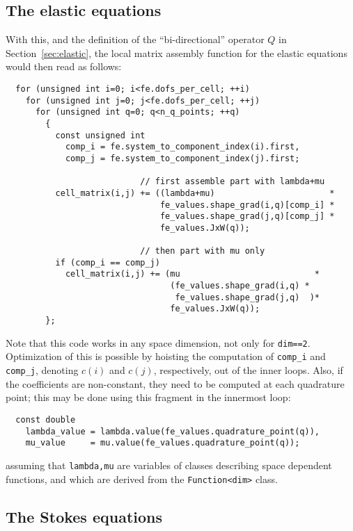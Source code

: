 \documentclass{article}
\begin{document}
\subsection{The elastic equations}
\label{sec:elastic-simple}

With this, and the definition of the ``bi-directional'' operator $Q$ in
Section~\ref{sec:elastic}, the local matrix assembly function for the elastic
equations would then read as follows:
\begin{verbatim}
  for (unsigned int i=0; i<fe.dofs_per_cell; ++i)
    for (unsigned int j=0; j<fe.dofs_per_cell; ++j)
      for (unsigned int q=0; q<n_q_points; ++q) 
        {
          const unsigned int
            comp_i = fe.system_to_component_index(i).first,
            comp_j = fe.system_to_component_index(j).first;

                           // first assemble part with lambda+mu
          cell_matrix(i,j) += ((lambda+mu)                       *
                               fe_values.shape_grad(i,q)[comp_i] * 
                               fe_values.shape_grad(j,q)[comp_j] *
                               fe_values.JxW(q)); 

                           // then part with mu only
          if (comp_i == comp_j)
            cell_matrix(i,j) += (mu                           *
                                 (fe_values.shape_grad(i,q) * 
                                  fe_values.shape_grad(j,q)  )*
                                 fe_values.JxW(q)); 
        };
\end{verbatim}
Note that this code works in any space dimension, not only for
\texttt{dim==2}. Optimization of this is possible by hoisting the computation
of \texttt{comp\_i} and \texttt{comp\_j}, denoting $c(i)$ and $c(j)$,
respectively, out of the inner loops. Also, if the coefficients are
non-constant, they need to be computed at each quadrature point; this may be
done using this fragment in the innermost loop:
\begin{verbatim}
  const double
    lambda_value = lambda.value(fe_values.quadrature_point(q)),
    mu_value     = mu.value(fe_values.quadrature_point(q));
\end{verbatim}
assuming that \texttt{lambda,mu} are variables of classes describing space
dependent functions, and which are derived
from the \texttt{Function<dim>} class.


\subsection{The Stokes equations}
\label{sec:stokes-simple}
\end{document}
